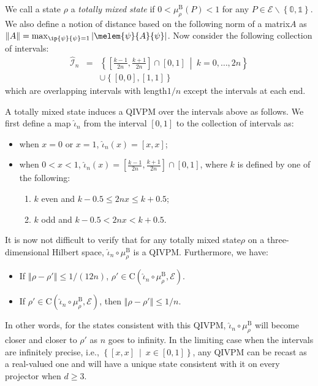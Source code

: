 \documentclass[english,reprint, aps, prl,superscriptaddress, showpacs,
showkeys, longbibliography, amsmath, amssymb]{revtex4-1}
\theoremstyle{plain}
\theoremstyle{definition}
\newcommand{\events}{\ensuremath{\mathcal{E}}}
\newcommand{\set}[2]{\ensuremath{\left\{ {#1}~\middle|~{#2}\right\} }}
\newcommand{\coreBorn}{\ensuremath{\mathrm{C}}}
\newcommand{\nb}{\nolinebreak[1] }
\begin{document}
We call a state $\rho$ a \emph{totally mixed state} if
$0<\mu_{\rho}^{\mathrm{B}}\left(P\right)<1$ for any
$P\in\events\backslash\left\{ \mathbb{0},\mathbb{1}\right\} $. We also
define a notion of distance based on the following norm of a
matrix\nb$A$ as
$\left\Vert A\right\Vert
=\max_{\ip{\psi}{\psi}=1}\left|\melem{\psi}{A}{\psi}\right|$\nb\citep{544199}. Now
consider the following collection of intervals:
\begin{eqnarray}
\widehat{\mathscr{I}}_{n} & = & \set{\left[\frac{k-1}{2n},\frac{k+1}{2n}\right]\cap\left[0,1\right]}{k=0,\ldots,2n}\nonumber \\
 &  & \cup\left\{ \left[0,0\right],\left[1,1\right]\right\} 
\end{eqnarray}
which are overlapping intervals with length\nb$1/n$ except the intervals
at each end. 

A totally mixed state induces a QIVPM over the intervals above as
follows. We first define a map $\widehat{\iota}_{n}$ from the interval
$[0,1]$ to the collection of intervals as:
\begin{itemize}
\item when $x=0$ or $x=1$, $\widehat{\iota}_{n}\left(x\right)=\left[x,x\right]$;
\item when $0<x<1$, $\widehat{\iota}_{n}\left(x\right)=\left[\frac{k-1}{2n},\frac{k+1}{2n}\right]\cap\left[0,1\right]$,
where $k$ is defined by one of the following:
\begin{enumerate}
\item $k$ even and $k-0.5\le2nx\le k+0.5$;
\item $k$ odd and $k-0.5<2nx<k+0.5$.
\end{enumerate}
\end{itemize}

It is now not difficult to verify that for any totally mixed
state\nb$\rho$ on a three-dimensional Hilbert space,
$\widehat{\iota}_{n}\circ\mu_{\rho}^{\mathrm{B}}$ is a
QIVPM. Furthermore, we have:
\begin{itemize}
\item If $\left\Vert \rho-\rho'\right\Vert \le1/\left(12n\right)$,
$\rho'\in\coreBorn\left(\widehat{\iota}_{n}\circ\mu_{\rho}^{\mathrm{B}},\events\right)$.
\item If $\rho'\in\coreBorn\left(\widehat{\iota}_{n}\circ\mu_{\rho}^{\mathrm{B}},\events\right)$,
then $\left\Vert \rho-\rho'\right\Vert \le1/n$.
\end{itemize}
In other words, for the states consistent with this QIVPM,
$\widehat{\iota}_{n}\circ\mu_{\rho}^{\mathrm{B}}$ will become closer and
closer to $\rho'$ as $n$ goes to infinity. In the limiting case when
the intervals are infinitely precise, i.e.,
$\set{\left[x,x\right]}{x\in\left[0,1\right]}$, any QIVPM can be
recast as a real-valued one and will have a unique state consistent
with it on every projector when $d\ge3$.
\end{document}
